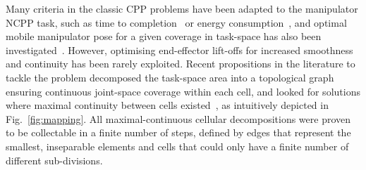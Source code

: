 \documentclass[journal]{IEEEtran}
\begin{document}
Many criteria in the classic CPP problems have been adapted to the manipulator NCPP task, such as time to completion~\cite{lu2020time} or energy consumption~\cite{mei2004energy}, and optimal mobile manipulator pose for a given coverage in task-space has also been investigated~\cite{paus2017a}. However, optimising  end-effector lift-offs for increased smoothness and continuity has been rarely exploited. %
Recent propositions in the literature to tackle the problem decomposed the task-space area into a %
topological graph ensuring continuous joint-space coverage within each cell, and looked for solutions where maximal continuity between cells existed~\cite{Yang2020Cellular}, as intuitively depicted in Fig.~\ref{fig:mapping}. 
All maximal-continuous cellular decompositions were proven to be collectable in a finite number of steps, defined by edges that represent the smallest, inseparable elements and cells that could only have a finite number of different sub-divisions.  

\end{document}

